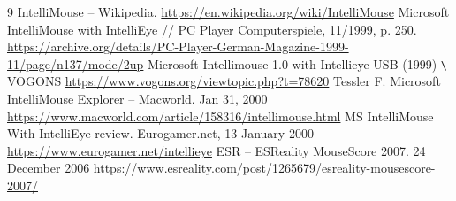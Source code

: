 \documentclass[11pt, a4paper]{article}
\begin{document}
\begin{thebibliography}{9}
     IntelliMouse -- Wikipedia. \url{https://en.wikipedia.org/wiki/IntelliMouse}
     Microsoft IntelliMouse with IntelliEye // PC Player Computerspiele, 11/1999, p. 250. \url{https://archive.org/details/PC-Player-German-Magazine-1999-11/page/n137/mode/2up}
     Microsoft Intellimouse 1.0 with Intellieye USB (1999) \verb!\! VOGONS \url{https://www.vogons.org/viewtopic.php?t=78620}
     Tessler F. Microsoft IntelliMouse Explorer -- Macworld. Jan 31, 2000 \url{https://www.macworld.com/article/158316/intellimouse.html}
     MS IntelliMouse With IntelliEye review. Eurogamer.net, 13 January 2000 \url{https://www.eurogamer.net/intellieye}
     ESR -- ESReality MouseScore 2007. 24 December 2006 \url{https://www.esreality.com/post/1265679/esreality-mousescore-2007/}
\end{thebibliography}
\end{document}
